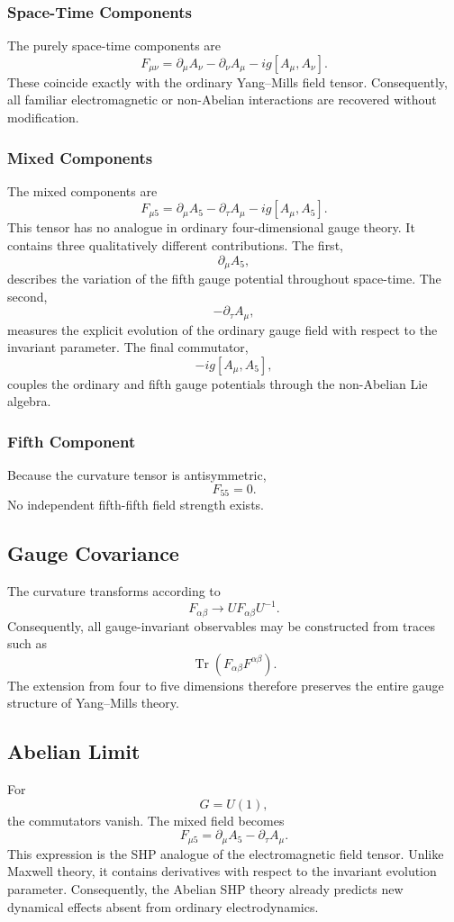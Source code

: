 \subsubsection{Space-Time Components}
The purely space-time components are
\[\boxed{F_{\mu\nu}=\partial_\mu A_\nu-\partial_\nu A_\mu-ig[A_\mu,A_\nu].}\]
These coincide exactly with the ordinary Yang--Mills field tensor.
Consequently,
all familiar electromagnetic or non-Abelian interactions are recovered
without modification.
\subsubsection{Mixed Components}
The mixed components are
\[\boxed{F_{\mu5}=\partial_\mu A_5-\partial_\tau A_\mu-ig[A_\mu,A_5].}\]
This tensor has no analogue in ordinary four-dimensional gauge theory.
It contains three qualitatively different contributions.
The first,
\[\partial_\mu A_5,\]
describes the variation of the fifth gauge potential throughout
space-time.
The second,
\[-\partial_\tau A_\mu,\]
measures the explicit evolution of the ordinary gauge field with respect
to the invariant parameter.
The final commutator,
\[-ig[A_\mu,A_5],\]
couples the ordinary and fifth gauge potentials through the non-Abelian
Lie algebra.
\subsubsection{Fifth Component}
Because the curvature tensor is antisymmetric,
\[F_{55}=0.\]
No independent fifth-fifth field strength exists.
\subsection{Gauge Covariance}
The curvature transforms according to
\[\boxed{F_{\alpha\beta}\rightarrow UF_{\alpha\beta}U^{-1}.}\]
Consequently,
all gauge-invariant observables may be constructed from traces such as
\[\operatorname{Tr}(F_{\alpha\beta}F^{\alpha\beta}).\]
The extension from four to five dimensions therefore preserves the
entire gauge structure of Yang--Mills theory.
\subsection{Abelian Limit}
For
\[G=U(1),\]
the commutators vanish.
The mixed field becomes
\[\boxed{F_{\mu5}=\partial_\mu A_5-\partial_\tau A_\mu.}\]
This expression is the SHP analogue of the electromagnetic field tensor.
Unlike Maxwell theory,
it contains derivatives with respect to the invariant evolution
parameter.
Consequently,
the Abelian SHP theory already predicts new dynamical effects absent from
ordinary electrodynamics.

